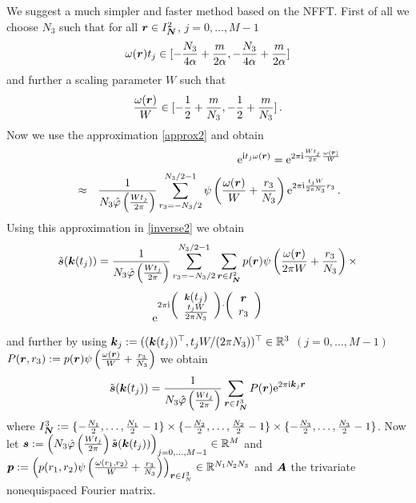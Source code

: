 \documentclass[journal]{IEEEtran}
\def\ti{\mbox{\scriptsize{\rm i}}}
\newcommand{\eip}[1]{{\rm e}^{ 2\pi{\ti} #1}}
\newcommand{\zb}[1]{\mbox{\boldmath{${#1}$}}}
\newcommand{\zbs}[1]{\mbox{\boldmath\scriptsize{${#1}$}}}
\newcommand{\zbss}[1]{\mbox{\boldmath\tiny{${#1}$}}}
\numberwithin{equation}{section}
\numberwithin{table}{section}
\numberwithin{figure}{section}
\begin{document}
 We suggest a much simpler and faster method based on the NFFT.
First of all we choose $N_3$ such that 
for all $\zb r\in I_{\zbs N}^2$, $j=0,\ldots,M-1$
\begin{equation}\label{wahlN3}
\omega(\zb r)t_j
\in[-\frac{N_3}{4\alpha}+\frac{m}{2\alpha},-\frac{N_3}{4\alpha}+\frac{m}{2\alpha}] 
\end{equation}
and further a scaling parameter $W$ such that
\[
\frac{\omega(\zb r)}{W}
\in[-\frac{1}{2}+\frac{m}{N_3},-\frac{1}{2}+\frac{m}{N_3}]\, . 
\]
Now we use the approximation \eqref{approx2} and obtain
\begin{eqnarray} \label{appr_inh}
&&{\rm e}^{\ti t_j \omega(\zbs r)}  =
\eip{\frac{W t_j}{2\pi} \frac{\omega(\zbss r)}{W}}\\ \nonumber
&\approx&
\frac{1}{N_3\hat\varphi\left(\frac{Wt_j}{2\pi}\right)}
\sum_{r_3=-N_3/2}^{N_3/2-1} \psi \left(\frac{\omega(\zb
  r)}{W}+\frac{r_3}{N_3}\right)  \eip{\frac{t_jW}{2\pi N_3}r_3}\, .
\end{eqnarray}
Using this approximation in \eqref{inverse2} we obtain
\begin{equation*}
\tilde{\zb s}(\zb k(t_j))=
\frac{1}{N_3 \hat\varphi\left(\frac{Wt_j}{2\pi}\right)}
\sum_{r_3=-N_3/2}^{N_3/2-1}
\sum_{\zbs r \in I^2_{\zbss N}} 
p(\zb r) \psi \left(\frac{\omega(\zb r)}{2\pi W}+\frac{r_3}{N_3}\right) \times
\end{equation*}
\begin{equation*}
\eip{\left(\begin{array}{c}
\zbs k(t_j)\\
\frac{t_jW}{2\pi N_3}
\end{array}\right)
\cdot
\left(\begin{array}{c}
\zb r\\
r_3
\end{array}\right)
}
\end{equation*}
and further by using $\zb k_j:= ((\zb k(t_j))^{\top},
  t_jW/(2\pi N_3))^{\top}\in \mathbb{R}^3$ $(j=0,\ldots, M-1)$
$P(\zb r,r_3):= p(\zb r) \psi \left(\frac{\omega(\zbs
  r)}{W}+\frac{r_3}{N_3}\right)$ 
we obtain
\begin{equation*}
\tilde{\zb s}(\zb k(t_j))=
\frac{1}{N_3 \hat\varphi\left(\frac{Wt_j}{2\pi}\right)}
\sum_{\zbs r \in I^3_{\zbss N}} 
P(\zb r) \eip{\zbs k_j\zbs r}
\end{equation*}
where $I^3_{\zbs N} :=
\{-\frac{N_1}{2},\dots,\frac{N_1}{2}-1\}\times\{-\frac{N_2}{2},\dots,
\frac{N_2}{2}-1\}\times\{-\frac{N_3}{2},\dots,\frac{N_3}{2}-1\}$.
Now let
$\zb s:=\left(N_3 \hat\varphi\left(\frac{Wt_j}{2\pi}\right)\tilde{\zb s}(\zb
  k(t_j))\right)_{j=0,\ldots, M-1}\in \mathbb{R}^M
$
and
$
\zb p :=\left(p(r_1,r_2) \psi \left(\frac{\omega(r_1,r_2)}{W}+\frac{r_3}{N_3}\right)\right)_{\zbs r\in I_N^3}\in
\mathbb{R}^{N_1N_2N_3}
$
and $\zb A$ the trivariate nonequispaced Fourier matrix.
\end{document}
